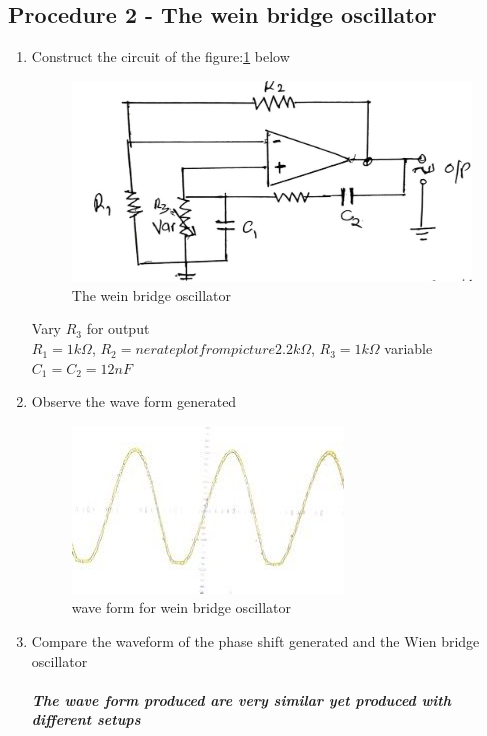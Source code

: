 \documentclass[12pt,a4paper]{report}
\begin{document}
\subsection{Procedure 2 - The wein bridge oscillator}
\begin{enumerate}
    \item Construct the circuit of the figure:\ref{fig:2} below
    \begin{figure}[H]
        \centering
        \includegraphics[width=0.5\linewidth]{circuit2_2.jpeg}
        \caption{The wein bridge oscillator}
        \label{fig:2}
    \end{figure}
    Vary $R_3$ for output\\
    $R_1 = 1k \Omega$, $R_2 = nerate plot from picture2.2k \Omega$, $R_3 = 1k \Omega$ variable\\
    $ C_1 = C_2 = 12nF$
    \item Observe the wave form generated
    \begin{figure}[H]
        \centering
        \includegraphics[width=0.5\linewidth]{2.jpeg}
        \caption{wave form for wein bridge oscillator}
        \label{fig:enter-label}
    \end{figure}
    \item Compare the waveform of the phase shift generated and the Wien bridge oscillator\\
    \\
    \textbf{\textit{The wave form produced are very similar yet produced with different setups}}\\
\end{enumerate}
\end{document}
